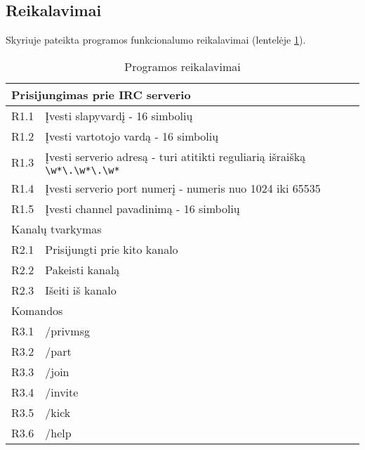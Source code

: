 \subsection{Reikalavimai}

Skyriuje pateikta programos funkcionalumo reikalavimai (lentelėje \ref{Programos reikalavimai}).

\begin{table}[H]
  \centering
  \caption{Programos reikalavimai}
  \begin{tabular}{|l|l|}
    \hline
    \multicolumn{2}{|l|}{Prisijungimas prie IRC serverio}                                  \\ \hline
    R1.1 & Įvesti slapyvardį - 16 simbolių                                                 \\ \hline
    R1.2 & Įvesti vartotojo vardą - 16 simbolių                                            \\ \hline
    R1.3 & Įvesti serverio adresą - turi atitikti reguliarią išraišką \verb!\w*\.\w*\.\w*! \\ \hline
    R1.4 & Įvesti serverio port numerį - numeris nuo 1024 iki 65535                        \\ \hline
    R1.5 & Įvesti channel pavadinimą - 16 simbolių                                         \\ \hline
    \multicolumn{2}{|l|}{Kanalų tvarkymas}                                                 \\ \hline
    R2.1 & Prisijungti prie kito kanalo                                                    \\ \hline
    R2.2 & Pakeisti kanalą                                                                 \\ \hline
    R2.3 & Išeiti iš kanalo                                                                \\ \hline
    \multicolumn{2}{|l|}{Komandos}                                                         \\ \hline
    R3.1 & /privmsg                                                                        \\ \hline
    R3.2 & /part                                                                           \\ \hline
    R3.3 & /join                                                                           \\ \hline
    R3.4 & /invite                                                                         \\ \hline
    R3.5 & /kick                                                                           \\ \hline
    R3.6 & /help                                                                           \\ \hline
  \end{tabular}
  \label{Programos reikalavimai}  
\end{table}
